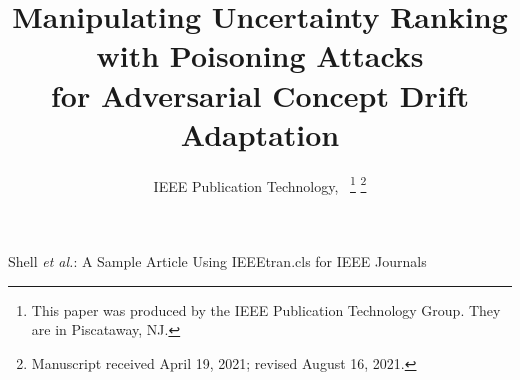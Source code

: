 \documentclass[lettersize,journal]{IEEEtran}
\begin{document}
\title{Manipulating Uncertainty Ranking with Poisoning Attacks \\ for Adversarial Concept Drift Adaptation}

\author{IEEE Publication Technology,~
\thanks{This paper was produced by the IEEE Publication Technology Group. They are in Piscataway, NJ.}%
\thanks{Manuscript received April 19, 2021; revised August 16, 2021.}}

%
{Shell \MakeLowercase{\textit{et al.}}: A Sample Article Using IEEEtran.cls for IEEE Journals}


\maketitle
\end{document}
